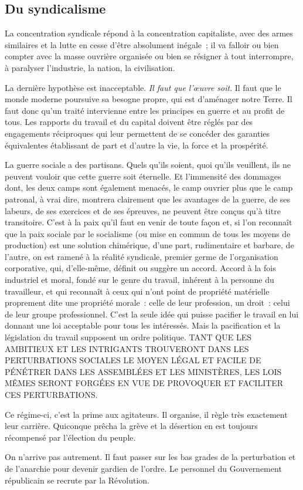 \documentclass[french,twoside]{book} %
\newcommand\chapterclose{} %
\begin{document}
\subsection[Du syndicalisme]{Du syndicalisme}
\noindent La concentration syndicale répond à la concentration capitaliste, avec des armes similaires et la lutte en cesse d’être absolument inégale ; il va falloir ou bien compter avec la masse ouvrière organisée ou bien se résigner à tout interrompre, à paralyser l’industrie, la nation, la civilisation.\par
La dernière hypothèse est inacceptable. \emph{Il faut que l’œuvre soit}. Il faut que le monde moderne poursuive sa besogne propre, qui est d’aménager notre Terre. Il faut donc qu’un traité intervienne entre les principes en guerre et au profit de tous. Les rapports du travail et du capital doivent être réglés par des engagements réciproques qui leur permettent de se concéder des garanties équivalentes établissant de part et d’autre la vie, la force et la prospérité.\par
La guerre sociale a des partisans. Quels qu’ils soient, quoi qu’ils veuillent, ils ne peuvent vouloir que cette guerre soit éternelle. Et l’immensité des dommages dont, les deux camps sont également menacés, le camp ouvrier plus que le camp patronal, à vrai dire, montrera clairement que les avantages de la guerre, de ses labeurs, de ses exercices et de ses épreuves, ne peuvent être conçus qu’à titre transitoire. C’est à la paix qu’il faut en venir de toute façon et, si l’on reconnaît que la paix sociale par le socialisme (ou mise en commun de tous les moyens de production) est une solution chimérique, d’une part, rudimentaire et barbare, de l’autre, on est ramené à la réalité syndicale, premier germe de l’organisation corporative, qui, d’elle-même, définit ou suggère un accord. Accord à la fois industriel et moral, fondé sur le genre du travail, inhérent à la personne du travailleur, et qui reconnaît à ceux qui n’ont point de propriété matérielle proprement dite une propriété morale : celle de leur profession, un droit : celui de leur groupe professionnel. C’est la seule idée qui puisse pacifier le travail en lui donnant une loi acceptable pour tous les intéressés. Mais la pacification et la législation du travail supposent un ordre politique. TANT QUE LES AMBITIEUX ET LES INTRIGANTS TROUVERONT DANS LES PERTURBATIONS SOCIALES LE MOYEN LÉGAL ET FACILE DE PÉNÉTRER DANS LES ASSEMBLÉES ET LES MINISTÈRES, LES LOIS MÊMES SERONT FORGÉES EN VUE DE PROVOQUER ET FACILITER CES PERTURBATIONS.\par
Ce régime-ci, c’est la prime aux agitateurs. Il organise, il règle très exactement leur carrière. Quiconque prêcha la grève et la désertion en est toujours récompensé par l’élection du peuple.\par
On n’arrive pas autrement. Il faut passer sur les bas grades de la perturbation et de l’anarchie pour devenir gardien de l’ordre. Le personnel du Gouvernement républicain se recrute par la Révolution.
\chapterclose
\end{document}
